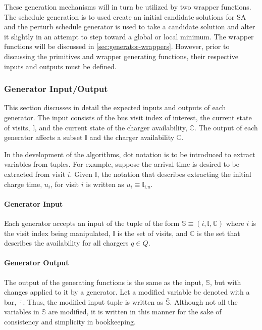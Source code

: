 \documentclass[11pt,a4paper,final]{article}
\newcommand{\I}{\mathbb{I}}                 %
\newcommand{\C}{\mathbb{C}}                 %
\newcommand{\Sol}{\mathbb{S}}               %
\newcommand{\Qset}{Q}                       %
\begin{document}
These generation mechanisms will in turn be utilized by two wrapper functions. The schedule generation is to used create
an initial candidate solutions for SA and the perturb schedule generator is used to take a candidate solution and alter
it slightly in an attempt to step toward a global or local minimum. The wrapper functions will be discussed in
\ref{sec:generator-wrappers}. However, prior to discussing the primitives and wrapper generating functions, their respective
inputs and outputs must be defined.

\subsubsection{Generator Input/Output}
\label{sec:generator-input-output}
This section discusses in detail the expected inputs and outputs of each generator. The input consists of the bus visit
index of interest, the current state of visits, \(\I\), and the current state of the charger availability, \(\C\). The
output of each generator affects a subset \(\I\) and the charger availability \(\C\).

In the development of the algorithms, dot notation is to be introduced to extract variables from tuples. For example,
suppose the arrival time is desired to be extracted from visit \(i\). Given \(\I\), the notation that describes extracting
the initial charge time, \(u_i\), for visit \(i\) is written as \(u_i \equiv \I_{i.u}\).

\paragraph{Generator Input}
\label{sec:org5c8f5a6}
Each generator accepts an input of the tuple of the form \(\Sol \equiv (i, \I, \C)\) where \(i\) is the visit index being
manipulated, \(\I\) is the set of visits, and \(\C\) is the set that describes the availability for all chargers \(q \in
\Qset\).

\paragraph{Generator Output}
\label{sec:org8618512}
The output of the generating functions is the same as the input, \(\Sol\), but with changes applied to it by a generator.
Let a modified variable be denoted with a bar, \(\bar{\cdot}\). Thus, the modified input tuple is written as \(\bar{\Sol}\).
Although not all the variables in \(\Sol\) are modified, it is written in this manner for the sake of consistency and
simplicity in bookkeeping.
\end{document}
